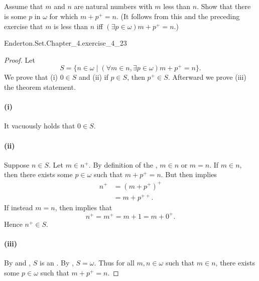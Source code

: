 \documentclass{report}
\begin{document}
\subsection{}%

  Assume that $m$ and $n$ are natural numbers with $m$ less than $n$.
  Show that there is some $p$ in $\omega$ for which $m + p^+ = n$.
  (It follows from this and the preceding exercise that $m$ is less than $n$ iff
    $(\exists p \in \omega)m + p^+ = n$.)

    {Enderton.Set.Chapter\_4.exercise\_4\_23}

  \begin{proof}

    Let $$S = \{n \in \omega \mid
      (\forall m \in n, \exists p \in \omega) m + p^+ = n\}.$$
    We prove that (i) $0 \in S$ and (ii) if $p \in S$, then $p^+ \in S$.
    Afterward we prove (iii) the theorem statement.

    \paragraph{(i)}%

      It vacuously holds that $0 \in S$.

    \paragraph{(ii)}%

      Suppose $n \in S$.
      Let $m \in n^+$.
      By definition of the , $m \in n$ or $m = n$.
      If $m \in n$, then there exists some $p \in \omega$ such that
        $m + p^+ = n$.
      But then  implies
        \begin{align*}
          n^+
            & = (m + p^+)^+ \\
            & = m + p^{++}.
        \end{align*}
      If instead $m = n$, then  implies that
        $$n^+ = m^+ = m + 1 = m + 0^+.$$
      Hence $n^+ \in S$.

    \paragraph{(iii)}%

      By  and , $S$
        is an .
      By , $S = \omega$.
      Thus for all $m, n \in \omega$ such that $m \in n$, there exists some
        $p \in \omega$ such that $m + p^+ = n$.

  \end{proof}
\end{document}
